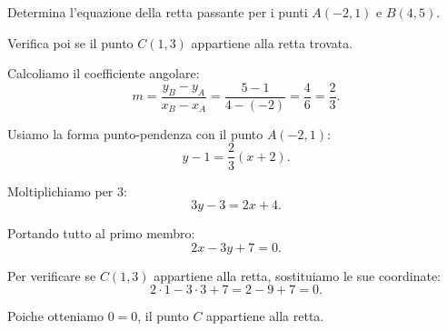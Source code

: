
\begin{esercizio}
Determina l'equazione della retta passante per i punti
\(A(-2,1)\) e \(B(4,5)\).

Verifica poi se il punto \(C(1,3)\) appartiene alla retta trovata.
\end{esercizio}

\begin{soluzione}
Calcoliamo il coefficiente angolare:
\[
m=\frac{y_B-y_A}{x_B-x_A}
=\frac{5-1}{4-(-2)}
=\frac{4}{6}
=\frac{2}{3}.
\]

Usiamo la forma punto-pendenza con il punto \(A(-2,1)\):
\[
y-1=\frac{2}{3}(x+2).
\]

Moltiplichiamo per \(3\):
\[
3y-3=2x+4.
\]

Portando tutto al primo membro:
\[
2x-3y+7=0.
\]

Per verificare se \(C(1,3)\) appartiene alla retta, sostituiamo le sue
coordinate:
\[
2\cdot 1-3\cdot 3+7=2-9+7=0.
\]

Poiche otteniamo \(0=0\), il punto \(C\) appartiene alla retta.
\end{soluzione}
